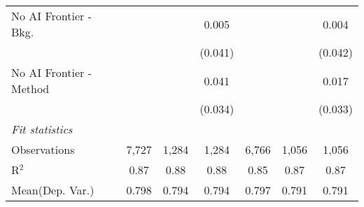 \begin{tabular}{lcccccc}
   No AI Frontier - Bkg.   &         &              & 0.005   &         &              & 0.004\\   
                           &         &              & (0.041) &         &              & (0.042)\\   
   No AI Frontier - Method &         &              & 0.041   &         &              & 0.017\\   
                           &         &              & (0.034) &         &              & (0.033)\\   
   \midrule
   \emph{Fit statistics}\\
   Observations            & 7,727   & 1,284        & 1,284   & 6,766   & 1,056        & 1,056\\  
   R$^2$                   & 0.87    & 0.88         & 0.88    & 0.85    & 0.87         & 0.87\\  
Mean(Dep. Var.) & 0.798 & 0.794 & 0.794 & 0.797 & 0.791 & 0.791 \\
   

\end{tabular}

